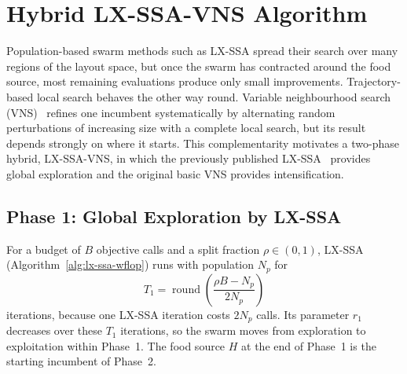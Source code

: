 \section{Hybrid LX-SSA-VNS Algorithm}
\label{sec:hybrid}
Population-based swarm methods such as LX-SSA spread their search over many regions of the layout space, but once the swarm has contracted around the food source, most remaining evaluations produce only small improvements. Trajectory-based local search behaves the other way round. Variable neighbourhood search (VNS)~\cite{Mladenovic1997,Hansen2001} refines one incumbent systematically by alternating random perturbations of increasing size with a complete local search, but its result depends strongly on where it starts. This complementarity motivates a two-phase hybrid, LX-SSA-VNS, in which the previously published LX-SSA~\cite{Solanki2023} provides global exploration and the original basic VNS provides intensification.

\subsection{Phase 1: Global Exploration by LX-SSA}
For a budget of $B$ objective calls and a split fraction $\rho\in(0,1)$, LX-SSA (Algorithm~\ref{alg:lx-ssa-wflop}) runs with population $N_p$ for
\[
T_1=\operatorname{round}\!\left(\frac{\rho B-N_p}{2N_p}\right)
\]
iterations, because one LX-SSA iteration costs $2N_p$ calls. Its parameter $r_1$ decreases over these $T_1$ iterations, so the swarm moves from exploration to exploitation within Phase~1. The food source $H$ at the end of Phase~1 is the starting incumbent of Phase~2.

